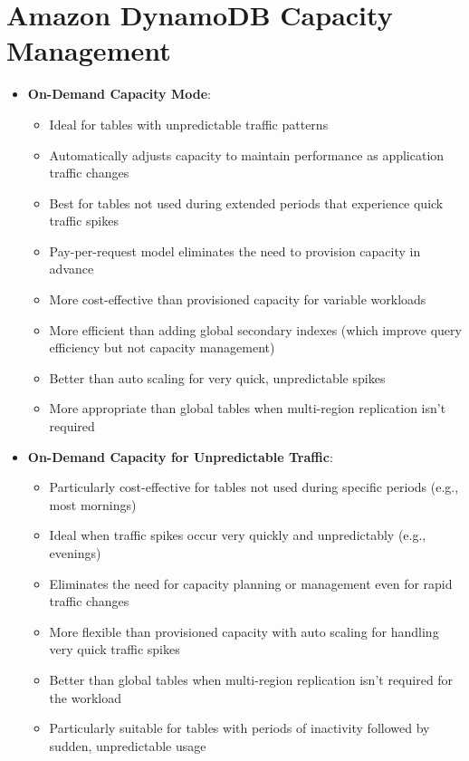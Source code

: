 \documentclass[11pt,a4paper]{report}
\begin{document}
\section{Amazon DynamoDB Capacity Management}

\begin{itemize}
  \item \textbf{On-Demand Capacity Mode}:
\begin{itemize}
  \item Ideal for tables with unpredictable traffic patterns
  \item Automatically adjusts capacity to maintain performance as application traffic changes
  \item Best for tables not used during extended periods that experience quick traffic spikes
  \item Pay-per-request model eliminates the need to provision capacity in advance
  \item More cost-effective than provisioned capacity for variable workloads
  \item More efficient than adding global secondary indexes (which improve query efficiency but not capacity management)
  \item Better than auto scaling for very quick, unpredictable spikes
  \item More appropriate than global tables when multi-region replication isn't required
\end{itemize}
  \item \textbf{On-Demand Capacity for Unpredictable Traffic}:
\begin{itemize}
  \item Particularly cost-effective for tables not used during specific periods (e.g., most mornings)
  \item Ideal when traffic spikes occur very quickly and unpredictably (e.g., evenings)
  \item Eliminates the need for capacity planning or management even for rapid traffic changes
  \item More flexible than provisioned capacity with auto scaling for handling very quick traffic spikes
  \item Better than global tables when multi-region replication isn't required for the workload
  \item Particularly suitable for tables with periods of inactivity followed by sudden, unpredictable usage
\end{itemize}
\end{itemize}
\end{document}

